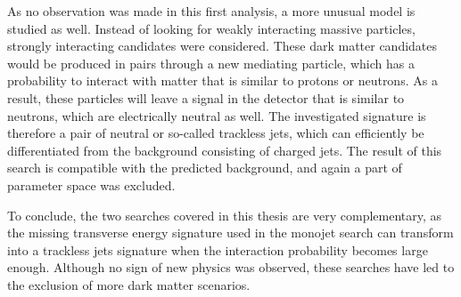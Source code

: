 As no observation was made in this first analysis, a more unusual model is studied as well. Instead of looking for weakly interacting massive particles, strongly interacting candidates were considered. These dark matter candidates would be produced in pairs through a new mediating particle, which has a probability to interact with matter that is similar to protons or neutrons. As a result, these particles will leave a signal in the detector that is similar to neutrons, which are electrically neutral as well. The investigated signature is therefore a pair of neutral or so-called trackless jets, which can efficiently be differentiated from the background consisting of charged jets. The result of this search is compatible with the predicted background, and again a part of parameter space was excluded.

To conclude, the two searches covered in this thesis are very complementary, as the missing transverse energy signature used in the monojet search can transform into a trackless jets signature when the interaction probability becomes large enough. Although no sign of new physics was observed, these searches have led to the exclusion of more dark matter scenarios.
% 
% 
